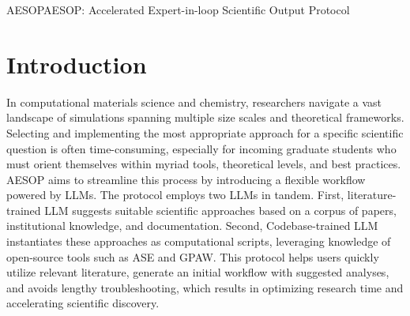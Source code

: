 



\begin{teamsubmission}{AESOP}{AESOP: Accelerated Expert-in-loop Scientific Output Protocol}



\section*{Introduction}
In computational materials science and chemistry, researchers navigate a vast landscape of simulations spanning multiple size scales and theoretical frameworks. Selecting and implementing the most appropriate approach for a specific scientific question is often time-consuming, especially for incoming graduate students who must orient themselves within myriad tools, theoretical levels, and best practices. AESOP aims to streamline this process by introducing a flexible workflow powered by LLMs. The protocol employs two LLMs in tandem. First, literature-trained LLM suggests suitable scientific approaches based on a corpus of papers, institutional knowledge, and documentation. Second, Codebase-trained LLM instantiates these approaches as computational scripts, leveraging knowledge of open-source tools such as ASE\cite{larsen2017atomic} and GPAW.\cite{mortensen2024} This protocol helps users quickly utilize relevant literature, generate an initial workflow with suggested analyses, and avoids lengthy troubleshooting, which results in optimizing research time and accelerating scientific discovery.


\end{teamsubmission}
